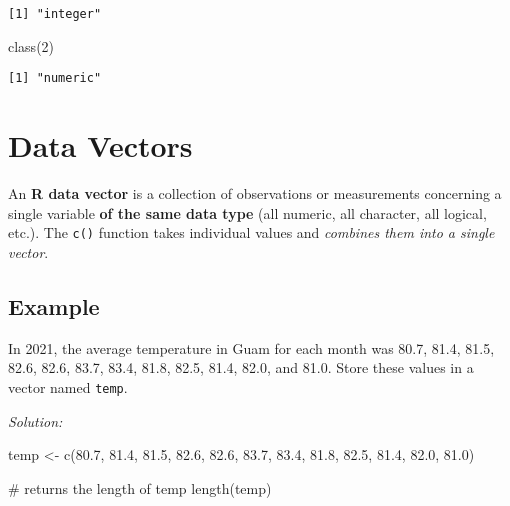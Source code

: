\documentclass[
  letterpaper,
  DIV=11,
  numbers=noendperiod]{scrreprt}
\newenvironment{Shaded}{\begin{snugshade}}{\end{snugshade}}
\newcommand{\CommentTok}[1]{\textcolor[rgb]{0.37,0.37,0.37}{#1}}
\newcommand{\DecValTok}[1]{\textcolor[rgb]{0.68,0.00,0.00}{#1}}
\newcommand{\FloatTok}[1]{\textcolor[rgb]{0.68,0.00,0.00}{#1}}
\newcommand{\FunctionTok}[1]{\textcolor[rgb]{0.28,0.35,0.67}{#1}}
\newcommand{\NormalTok}[1]{\textcolor[rgb]{0.00,0.23,0.31}{#1}}
\newcommand{\OtherTok}[1]{\textcolor[rgb]{0.00,0.23,0.31}{#1}}
\begin{document}
\begin{verbatim}
[1] "integer"
\end{verbatim}

\begin{Shaded}
\begin{Highlighting}[]
\FunctionTok{class}\NormalTok{(}\DecValTok{2}\NormalTok{)}
\end{Highlighting}
\end{Shaded}

\begin{verbatim}
[1] "numeric"
\end{verbatim}

\section*{Data Vectors}\label{data-vectors}


An \textbf{R data vector} is a collection of observations or
measurements concerning a single variable \textbf{of the same data type}
(all numeric, all character, all logical, etc.). The \texttt{c()}
function takes individual values and \emph{combines them into a single
vector}.

\subsection*{Example}\label{example}

In 2021, the average temperature in Guam for each month was 80.7, 81.4,
81.5, 82.6, 82.6, 83.7, 83.4, 81.8, 82.5, 81.4, 82.0, and 81.0. Store
these values in a vector named \texttt{temp}.

\emph{Solution:}

\begin{Shaded}
\begin{Highlighting}[]
\NormalTok{temp }\OtherTok{\textless{}{-}} \FunctionTok{c}\NormalTok{(}\FloatTok{80.7}\NormalTok{, }\FloatTok{81.4}\NormalTok{, }\FloatTok{81.5}\NormalTok{, }\FloatTok{82.6}\NormalTok{, }\FloatTok{82.6}\NormalTok{, }\FloatTok{83.7}\NormalTok{, }\FloatTok{83.4}\NormalTok{, }\FloatTok{81.8}\NormalTok{, }\FloatTok{82.5}\NormalTok{, }\FloatTok{81.4}\NormalTok{, }\FloatTok{82.0}\NormalTok{, }\FloatTok{81.0}\NormalTok{)}
\end{Highlighting}
\end{Shaded}

\begin{Shaded}
\begin{Highlighting}[]
\CommentTok{\# returns the length of temp }
\FunctionTok{length}\NormalTok{(temp)}
\end{Highlighting}
\end{Shaded}
\end{document}
